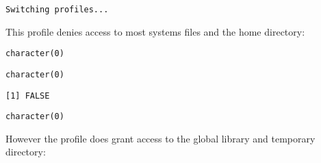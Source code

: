 


\begin{knitrout}\mycodesize
{}\color{fgcolor}\begin{kframe}
\begin{alltt}
\hlstd{(}\hlstd{)}
\end{alltt}
\begin{verbatim}
Switching profiles...
\end{verbatim}
\end{kframe}
\end{knitrout}


This profile denies access to most systems files and the home directory:

\begin{knitrout}\mycodesize
{}\color{fgcolor}\begin{kframe}
\begin{alltt}
\hlstd{(}\hlstd{)}
\end{alltt}
\begin{verbatim}
character(0)
\end{verbatim}
\begin{alltt}
\hlstd{(}\hlstd{)}
\end{alltt}
\begin{verbatim}
character(0)
\end{verbatim}
\begin{alltt}
\hlstd{(}\hlstd{)}
\end{alltt}


{\ttfamily\noindent{}}\begin{verbatim}
[1] FALSE
\end{verbatim}
\begin{alltt}
\hlstd{(}\hlstd{)}
\end{alltt}
\begin{verbatim}
character(0)
\end{verbatim}
\end{kframe}
\end{knitrout}


However the profile does grant access to the global library and temporary directory:

